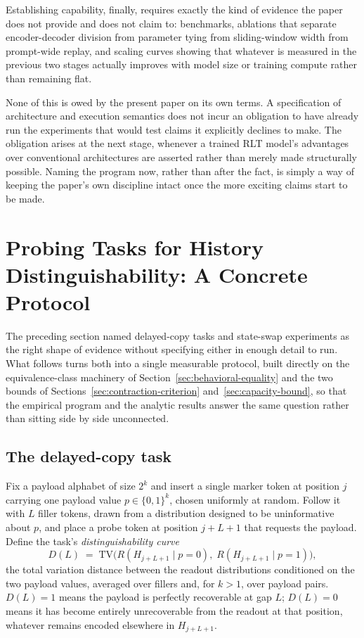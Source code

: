 \documentclass[11pt]{article}
\begin{document}
Establishing capability, finally, requires exactly the kind of evidence the paper does not provide and does not claim to: benchmarks, ablations that separate encoder-decoder division from parameter tying from sliding-window width from prompt-wide replay, and scaling curves showing that whatever is measured in the previous two stages actually improves with model size or training compute rather than remaining flat.

None of this is owed by the present paper on its own terms. A specification of architecture and execution semantics does not incur an obligation to have already run the experiments that would test claims it explicitly declines to make. The obligation arises at the next stage, whenever a trained RLT model's advantages over conventional architectures are asserted rather than merely made structurally possible. Naming the program now, rather than after the fact, is simply a way of keeping the paper's own discipline intact once the more exciting claims start to be made.

\section{Probing Tasks for History Distinguishability: A Concrete Protocol}
\label{sec:probing-protocol}

The preceding section named delayed-copy tasks and state-swap experiments as the right shape of evidence without specifying either in enough detail to run. What follows turns both into a single measurable protocol, built directly on the equivalence-class machinery of Section~\ref{sec:behavioral-equality} and the two bounds of Sections~\ref{sec:contraction-criterion} and~\ref{sec:capacity-bound}, so that the empirical program and the analytic results answer the same question rather than sitting side by side unconnected.

\subsection{The delayed-copy task}

Fix a payload alphabet of size $2^k$ and insert a single marker token at position $j$ carrying one payload value $p \in \{0,1\}^k$, chosen uniformly at random. Follow it with $L$ filler tokens, drawn from a distribution designed to be uninformative about $p$, and place a probe token at position $j + L + 1$ that requests the payload. Define the task's \emph{distinguishability curve}
\[
D(L) \;=\; \mathrm{TV}\Big(R(H_{j+L+1} \mid p=0),\; R(H_{j+L+1} \mid p=1)\Big),
\]
the total variation distance between the readout distributions conditioned on the two payload values, averaged over fillers and, for $k>1$, over payload pairs. $D(L)=1$ means the payload is perfectly recoverable at gap $L$; $D(L)=0$ means it has become entirely unrecoverable from the readout at that position, whatever remains encoded elsewhere in $H_{j+L+1}$.
\end{document}
